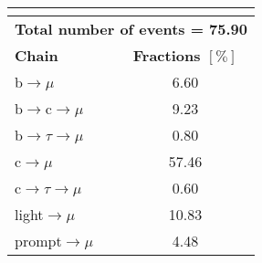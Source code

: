 \begin{tabular}{|l|c|}          
	\hline          
	\multicolumn{2}{|l|}{\textbf{\VVHF}}    \\        
	\hline          
	\multicolumn{2}{|l|}{\textbf{Total number of events = 75.90}}    \\
	\hline
	\textbf{Chain}        									 & \textbf{Fractions $[\%]$} \\                          
	\hline          
	b$\rightarrow \mu$                 					&   6.60  \\          
	b$\rightarrow$c$\rightarrow \mu$     	&    9.23    \\          
	b$\rightarrow \tau \rightarrow \mu$  	&    0.80 \\          
	c$\rightarrow \mu$                 				 &    57.46\\          
	c$\rightarrow \tau \rightarrow \mu$  	&     0.60\\          
	light$\rightarrow \mu$              			&    10.83 \\          
	prompt$\rightarrow \mu$                	 	&  4.48\\            
	\hline    
\end{tabular}    
